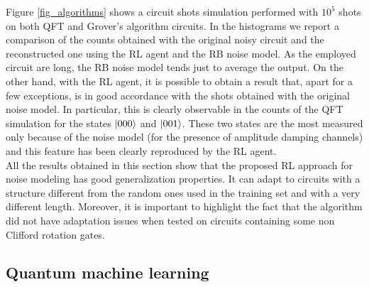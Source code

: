 \documentclass[referee,sn-basic]{sn-jnl} %
\begin{document}
\noindent
Figure \ref{fig_algorithms} shows a circuit shots simulation performed with $10^5$ shots on both QFT and Grover's algorithm circuits. In the histograms we report a comparison of the counts obtained with the original noisy circuit and the reconstructed one using the RL agent and the RB noise model. As the employed circuit are long, the RB noise model tends just to average the output. On the other hand, with the RL agent, it is possible to obtain a result that, apart for a few exceptions, is in good accordance with the shots obtained with the original noise model. In particular, this is clearly observable in the counts of the QFT simulation for the states $\ket{000}$ and $\ket{001}$. These two states are the most measured only because of the noise model (for the presence of amplitude damping channels) and this feature has been clearly reproduced by the RL agent.\\
All the results obtained in this section show that the proposed RL approach for noise modeling has good generalization properties. It can adapt to circuits with a structure different from the random ones used in the training set and with a very different length. Moreover, it is important to highlight the fact that the algorithm did not have adaptation issues when tested on circuits containing some non Clifford rotation gates.

\subsection{Quantum machine learning}
\end{document}
